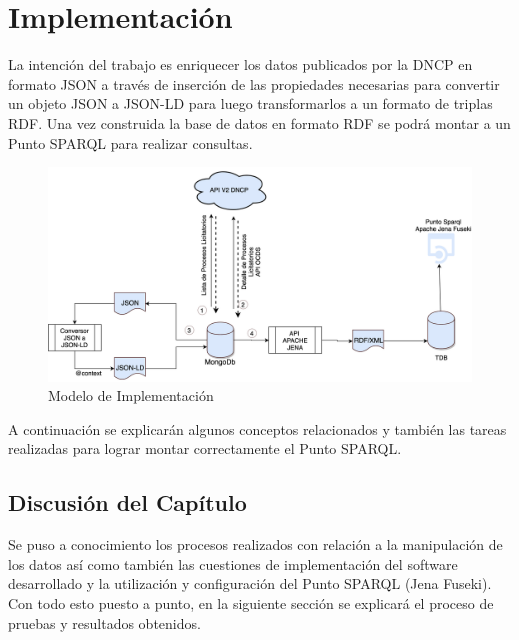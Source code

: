 \chapter{Implementación}
\label{chap:Implementación de la Ontologia}

La intención del trabajo es enriquecer los datos publicados por la DNCP en formato JSON a través de inserción de las propiedades necesarias para convertir un objeto JSON a JSON-LD para luego transformarlos a un formato de triplas RDF. Una vez construida la base de datos en formato RDF se podrá montar a un Punto SPARQL para realizar consultas.


\begin{figure}[h!]
   \centering
   \includegraphics[width=150mm]{figuras/Diagramas-Implementacion.png}

   \caption{Modelo de Implementación}
   \label{img:modelo de Implementacion}
\end{figure}

A continuación se explicarán algunos conceptos relacionados y también las tareas realizadas para lograr montar correctamente el Punto SPARQL.















 \section{Discusión del Capítulo }

 Se puso a conocimiento los procesos realizados con relación a la manipulación de los datos así como también las cuestiones de implementación del software desarrollado y la utilización y configuración del Punto SPARQL (Jena Fuseki). Con todo esto puesto a punto, en la siguiente sección se explicará el proceso de pruebas y resultados obtenidos.



